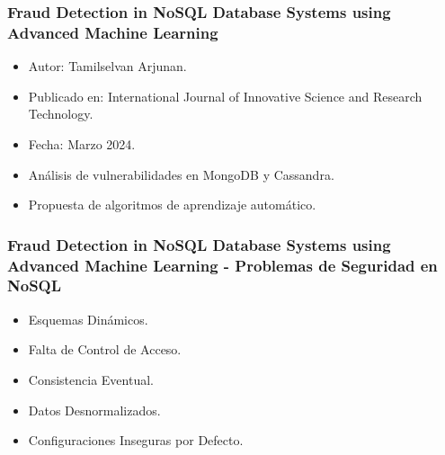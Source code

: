 \begin{frame}
    \frametitle{Fraud Detection in NoSQL Database Systems using Advanced Machine Learning}

    \begin{itemize}
        \item Autor: Tamilselvan Arjunan.
         
        \item Publicado en: International Journal of Innovative Science and Research Technology.
        \item Fecha: Marzo 2024.
         
        \item Análisis de vulnerabilidades en MongoDB y Cassandra.
         
        \item Propuesta de algoritmos de aprendizaje automático.
    \end{itemize}
\end{frame}

\begin{frame}
    \frametitle{Fraud Detection in NoSQL Database Systems using Advanced Machine Learning - Problemas de Seguridad en NoSQL}
    \begin{itemize}
        \item Esquemas Dinámicos.
         
        \item Falta de Control de Acceso.
         
        \item Consistencia Eventual.
         
        \item Datos Desnormalizados.
         
        \item Configuraciones Inseguras por Defecto.
    \end{itemize}
\end{frame}

